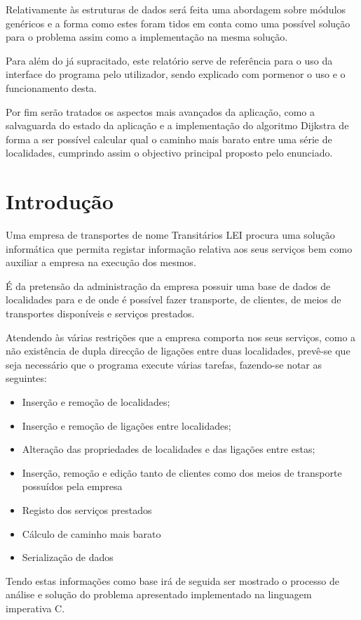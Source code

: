 \documentclass[a5paper,twocolumn, 11pt]{article}
\begin{document}
Relativamente às estruturas de dados será feita uma abordagem sobre módulos genéricos e a forma como estes foram tidos em conta como uma possível solução para o problema assim como a implementação na mesma solução.

Para além do já supracitado, este relatório serve de referência para o uso da interface do programa pelo utilizador, sendo explicado com pormenor o uso e o funcionamento desta.

Por fim serão tratados os aspectos mais avançados da aplicação, como a salvaguarda do estado da aplicação e a implementação do algoritmo Dijkstra de forma a ser possível calcular qual o caminho mais barato entre uma série de localidades, cumprindo assim o objectivo principal proposto pelo enunciado.

\clearpage
\section{Introdução}
Uma empresa de transportes de nome Transitários LEI procura uma solução informática que permita registar informação relativa aos seus serviços bem como auxiliar a empresa na execução dos mesmos.

É da pretensão da administração da empresa possuir uma base de dados de localidades para e de onde é possível fazer transporte, de clientes, de meios de transportes disponíveis e serviços prestados.

Atendendo às várias restrições que a empresa comporta nos seus serviços, como a não existência de dupla direcção de ligações entre duas localidades, prevê-se que seja necessário que o programa execute várias tarefas, fazendo-se notar as seguintes:
\begin{itemize}
    \item{Inserção e remoção de localidades;}
    \item{Inserção e remoção de ligações entre localidades;}
    \item{Alteração das propriedades de localidades e das ligações entre estas;}
    \item{Inserção, remoção e edição tanto de clientes como dos meios de transporte possuídos pela empresa}
    \item{Registo dos serviços prestados}
    \item{Cálculo de caminho mais barato}
    \item{Serialização de dados}
\end{itemize}
Tendo estas informações como base irá de seguida ser mostrado o processo de análise e
solução do problema apresentado implementado na linguagem imperativa C.
\end{document}
